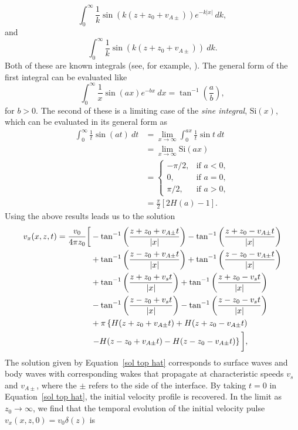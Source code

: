 \documentclass[12pt, draft]{../style-files/ociamthesis}
\begin{document}
\begin{equation}
\int_{0}^{\infty} \frac{1}{k}\sin(k(z + z_0 + v_{A\pm}))e^{-k|x|} ~dk,
\end{equation}
and
\begin{equation}
\int_{0}^{\infty} \frac{1}{k}\sin(k(z + z_0 + v_{A\pm})) ~dk.
\end{equation}
Both of these are known integrals (see, for example, \citealp{abr_etal65}). The general form of the first integral can be evaluated like
\begin{equation}
\int_{0}^{\infty} \frac{1}{x}\sin(ax) e^{-bx} ~dx = \tan^{-1}\left(\frac{a}{b}\right),
\end{equation}
for $b > 0$. The second of these is a limiting case of the \textit{sine integral}, $\mathrm{Si}(x)$, which can be evaluated in its general form as
\begin{align}
\int_{0}^{\infty} \frac{1}{t}\sin(at) ~dt &= \lim_{x \to \infty}\int_{0}^{ax} \frac{1}{t}\sin{t} ~dt \\
&= \lim_{x \to \infty} \mathrm{Si}(ax)  \\
&=
\begin{cases}
-\pi/2, &\text{if  } a < 0, \\
0, &\text{if  } a = 0, \\
\pi/2, &\text{if  } a > 0,
\end{cases} \\
&= \frac{\pi}{2} \left[2H(a) - 1\right].
\end{align}
Using the above results leads us to the solution
\begin{align}
v_x(x, z, t) = \frac{v_0}{4\pi z_0} \bigg[ &-\tan^{-1}\left( \frac{z + z_0 + v_{A\pm}t}{|x|} \right) - \tan^{-1}\left( \frac{z + z_0 - v_{A\pm}t}{|x|} \right)  \notag \\
&+ \tan^{-1}\left( \frac{z - z_0 + v_{A\pm}t}{|x|} \right) + \tan^{-1}\left( \frac{z - z_0 - v_{A\pm}t}{|x|} \right) \notag \\
&+ \tan^{-1}\left( \frac{z + z_0 + v_st}{|x|} \right) + \tan^{-1}\left( \frac{z + z_0 - v_st}{|x|} \right) \notag \\
&- \tan^{-1}\left( \frac{z - z_0 + v_st}{|x|} \right) - \tan^{-1}\left( \frac{z - z_0 - v_st}{|x|} \right) \notag \\
&+ \pi \left\{ H(z + z_0 + v_{A\pm}t) + H(z + z_0 - v_{A\pm}t) \right.  \notag \\
&\left. - H(z - z_0 + v_{A\pm}t) - H(z - z_0 - v_{A\pm}t) \right\} \bigg], \label{sol top hat}
\end{align}
The solution given by Equation~\eqref{sol top hat} corresponds to surface waves and body waves with corresponding wakes that propagate at characteristic speeds $v_s$ and $v_{A\pm}$, where the $\pm$ refers to the side of the interface. By taking $t = 0$ in Equation~\eqref{sol top hat}, the initial velocity profile is recovered. In the limit as $z_0 \to \infty$, we find that the temporal evolution of the initial velocity pulse $v_x(x, z, 0) = v_0 \delta(z)$ is
\end{document}
